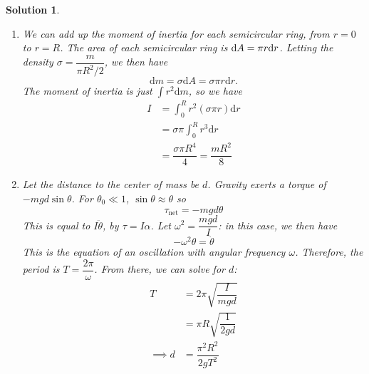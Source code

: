 \documentclass[12pt]{article}
\newtheorem*{solution}{Solution}
\theoremstyle{mystyle}
\begin{document}
\begin{solution}
    \begin{enumerate}[\Alph*)]
        \item We can add up the moment of inertia for each semicircular
            ring, from $r=0$ to $r=R$. The area of each semicircular
            ring is $\text dA=\pi r\text dr$. Letting the density
            $\sigma=\dfrac{m}{\pi R^2/2}$, we then have \[
                \mathrm{d}m=\sigma\mathrm{d}A=\sigma\pi r\mathrm{d}r.
            \]
            The moment of inertia is just $\int r^2\mathrm{d}m$,
            so we have
            \begin{align*}
                I&=\int_0^Rr^2(\sigma\pi r)\mathrm{d}r\\
                &=\sigma\pi\int_0^R r^3\mathrm{d}r\\
                &=\dfrac{\sigma\pi R^4}{4} = \dfrac{mR^2}{8}
            \end{align*}

        \item Let the distance to the center of mass be $d$. Gravity
            exerts a torque of $-mgd\sin\theta$. For $\theta_0\ll1$,
            $\sin\theta\approx\theta$ so \[
                \tau_\mathrm{net}=-mgd\theta
            \]
            This is equal to $I\ddot{\theta}$, by $\tau=I\alpha$.
            Let $\omega^2=\dfrac{mgd}{I}$: in this case,
            we then have \[
                -\omega^2\theta=\ddot{\theta}
            \]
            This is the equation of an oscillation with angular frequency
            $\omega$. Therefore, the period is $T=\dfrac{2\pi}{\omega}$.
            From there, we can solve for $d$:
            \begin{align*}
                T&=2\pi\sqrt{\dfrac{I}{mgd}}\\
                &=\pi R\sqrt{\dfrac{1}{2gd}}\\
                \implies d&=\dfrac{\pi^2R^2}{2gT^2}
            \end{align*}
    \end{enumerate}
\end{solution}
\end{document}
